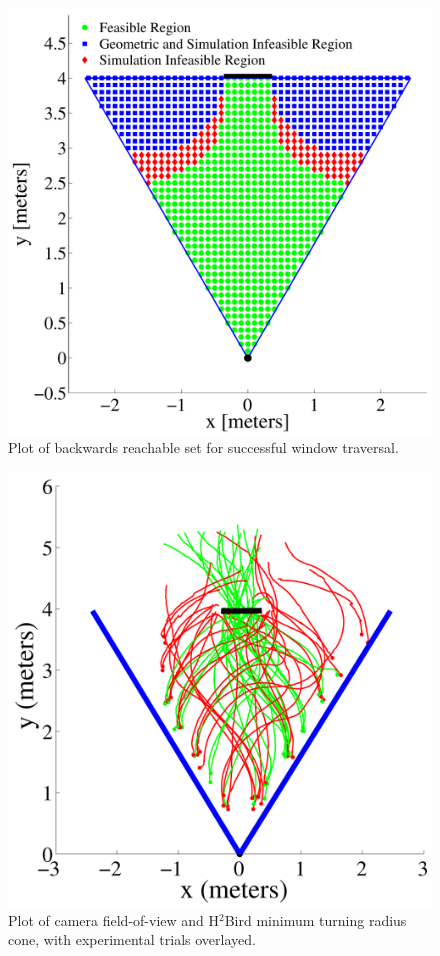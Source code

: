 \documentclass{aamas2013}
\begin{document}
\begin{figure}[tb]
\centering
\includegraphics[width=\linewidth]{figures/feasible_set.pdf}
\caption{Plot of backwards reachable set for successful window traversal.}
\label{fig:feasible_set}
\end{figure}

\begin{figure}[tb]
\centering
\includegraphics[width=\linewidth]{figures/flight_paths.pdf}
\caption{Plot of camera field-of-view and H$^2$Bird minimum turning radius cone, with experimental trials overlayed.}
\label{fig:flight_paths}
\end{figure}
\end{document}
